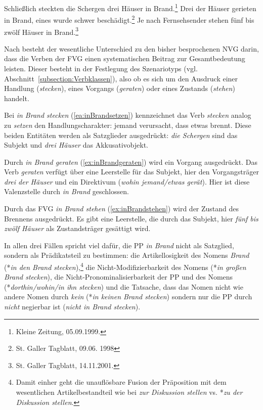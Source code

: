 \ea \label{ea:FVGBrand}
\ea \label{ea:inBrandsetzen} Schließlich steckten die Schergen drei Häuser in Brand.\footnote{Kleine Zeitung, 05.09.1999.}
\ex \label{ex:inBrandgeraten} Drei der Häuser gerieten in Brand, eines wurde schwer beschädigt.\footnote{St. Galler Tagblatt, 09.06.
1998}
\ex \label{ex:inBrandstehen} Je nach Fernsehsender stehen fünf bis zwölf Häuser in Brand.\footnote{St. Galler Tagblatt, 14.11.2001.}
\z 
\z 

Nach \citet[170]{Polenz1989} besteht der wesentliche Unterschied zu den bisher besprochenen NVG darin, dass die Verben der FVG einen systematischen Beitrag zur Gesamtbedeutung leisten. Dieser besteht in der Festlegung des Szenariotyps (vgl. Abschnitt~\ref{subsection:Verbklassen}), also ob es sich um den Ausdruck einer Handlung (\textit{stecken}), eines Vorgangs (\textit{geraten}) oder eines Zustands (\textit{stehen}) handelt. 

Bei \textit{in Brand stecken} (\ref{ea:inBrandsetzen}) kennzeichnet das Verb \textit{stecken} analog zu \textit{setzen} den Handlungscharakter: jemand verursacht, dass etwas brennt. Diese beiden Entitäten werden als Satzglieder ausgedrückt: \textit{die Schergen} sind das Subjekt und \textit{drei Häuser} das Akkusativobjekt. 

Durch \textit{in Brand geraten} (\ref{ex:inBrandgeraten}) wird ein Vorgang ausgedrückt. Das Verb \textit{geraten} verfügt über eine Leerstelle für das Subjekt, hier den Vorgangsträger \textit {drei der Häuser} und ein Direktivum (\textit{wohin jemand/etwas gerät}). Hier ist diese Valenzstelle durch \textit{in Brand} geschlossen.

Durch das FVG \textit{in Brand stehen} (\ref{ex:inBrandstehen}) wird der Zustand des Brennens ausgedrückt. Es gibt eine Leerstelle, die durch das Subjekt, hier \textit{fünf bis zwölf Häuser} als Zustandsträger gesättigt wird. 

In allen drei Fällen spricht viel dafür, die PP \textit{in Brand} nicht als Satzglied, sondern als Prädikatsteil zu bestimmen: die Artikellosigkeit des Nomens \textit{Brand} (*\textit{in den Brand stecken}),\footnote{Damit einher geht die unauflösbare Fusion der Präposition mit dem wesentlichen Artikelbestandteil wie bei \textit{zur Diskussion stellen} vs. *\textit{zu der Diskussion stellen}.} die Nicht-Modifizierbarkeit des Nomens (*\textit{in großen Brand stecken}), die Nicht-Pronominalisierbarkeit der PP und des Nomens (*\textit{dorthin/wohin/in ihn stecken}) und die Tatsache, dass das Nomen nicht wie andere Nomen durch \textit{kein} (*\textit{in keinen Brand stecken}) sondern nur die PP durch \textit{nicht} negierbar ist (\textit{nicht in Brand stecken}).

